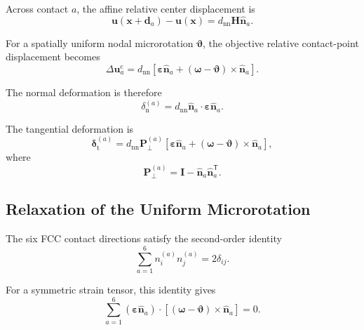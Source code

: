 Across contact $a$, the affine relative center displacement is
\begin{equation}
    \mathbf{u}(\mathbf{x}+\mathbf{d}_a) - \mathbf{u}(\mathbf{x}) = d_{\mathrm{nn}} \mathbf{H}\hat{\mathbf{n}}_a.
\end{equation}

For a spatially uniform nodal microrotation $\boldsymbol{\vartheta}$, the objective relative contact-point displacement becomes
\begin{equation}
    \Delta\mathbf{u}_a^{\mathrm{c}} = d_{\mathrm{nn}} \left[ \boldsymbol{\varepsilon}\hat{\mathbf{n}}_a + \left( \boldsymbol{\omega} - \boldsymbol{\vartheta} \right) \times \hat{\mathbf{n}}_a \right].
\end{equation}

The normal deformation is therefore
\begin{equation}
    \boxed{ \delta_{\mathrm{n}}^{(a)} = d_{\mathrm{nn}} \hat{\mathbf{n}}_a \cdot \boldsymbol{\varepsilon} \hat{\mathbf{n}}_a }.
\end{equation}

The tangential deformation is
\begin{equation}
    \boxed{ \boldsymbol{\delta}_{\mathrm{t}}^{(a)} = d_{\mathrm{nn}} \mathbf{P}_{\perp}^{(a)} \left[ \boldsymbol{\varepsilon}\hat{\mathbf{n}}_a + \left( \boldsymbol{\omega} - \boldsymbol{\vartheta} \right) \times \hat{\mathbf{n}}_a \right] },
\end{equation}
where
\begin{equation}
    \mathbf{P}_{\perp}^{(a)} = \mathbf{I} - \hat{\mathbf{n}}_a \hat{\mathbf{n}}_a^{\mathsf{T}}.
\end{equation}

\subsection{Relaxation of the Uniform Microrotation}

The six FCC contact directions satisfy the second-order identity
\begin{equation}
    \boxed{ \sum_{a=1}^{6} n_i^{(a)}n_j^{(a)} = 2\delta_{ij}. }
\end{equation}

For a symmetric strain tensor, this identity gives
\begin{equation}
    \sum_{a=1}^{6} \left( \boldsymbol{\varepsilon}\hat{\mathbf{n}}_a \right) \cdot \left[ \left( \boldsymbol{\omega} - \boldsymbol{\vartheta} \right) \times \hat{\mathbf{n}}_a \right] = 0.
\end{equation}

